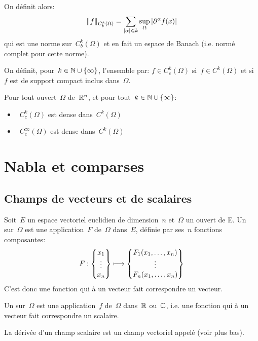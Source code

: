 On définit alors:
\begin{equation}
\|f\|_{C^k_b(\Omega)}=\displaystyle\sum_{|\alpha|\leqslant k} \sup_{\Omega} |\partial^\alpha f(x)|
\end{equation}
qui est une norme sur~$C^k_b(\Omega)$ et en fait un espace de Banach (i.e. normé complet pour cette norme).

\medskip
\begin{definition}\label{Def-Cc}
On définit, pour~$k\in\mathbb N\cup\{\infty\}$, l'ensemble  par:
$f\in C_c^k(\Omega)$ si~$f\in C^k(\Omega)$ et si~$f$ est de support compact inclus dans~$\Omega$.
\end{definition}

Pour tout ouvert~$\Omega$ de~$\mathbb R^n$, et pour tout~$k\in\mathbb N\cup\{\infty\}$:
\begin{itemize}
  \item~$C_c^k(\Omega)$ est dense dans~$C^k(\Omega)$
  \item~$C_c^\infty(\Omega)$ est dense dans~$C^k(\Omega)$
\end{itemize}

\medskip
\section{Nabla et comparses}

\subsection{Champs de vecteurs et de scalaires}

\begin{definition}
Soit~$E$ un espace vectoriel euclidien de dimension~$n$ et~$\Omega$ un ouvert de E.
Un  sur~$\Omega$ est une application~$F$ de~$\Omega$ dans~$E$, définie par ses~$n$ fonctions composantes:
\begin{equation}
  F: \VV*{x_1\\\vdots\\x_n} \longmapsto \VV*{F_1(x_1,\dots,x_n)\\ \vdots\\ F_n(x_1,\dots,x_n)}
\end{equation}
C'est donc une fonction qui à un vecteur fait correspondre un vecteur.
\end{definition}

\begin{definition}
Un  sur~$\Omega$ est une application~$f$ de~$\Omega$ dans~$\mathbb R$ ou~$\mathbb C$, i.e. une fonction qui à un vecteur fait correspondre un scalaire.
\end{definition}
La dérivée d'un champ scalaire est un champ vectoriel appelé  (voir plus bas).

